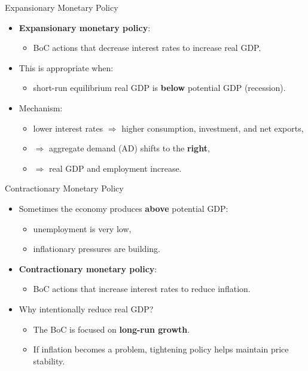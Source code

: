 \documentclass[aspectratio=169]{beamer}
\begin{document}
\begin{frame}{Expansionary Monetary Policy}
\transfade
\begin{itemize}[<+->]
  \item \textbf{Expansionary monetary policy}:
  \begin{itemize}[<+->]
    \item BoC actions that \alert{decrease} interest rates to \alert{increase} real GDP.
  \end{itemize}
  \item This is appropriate when:
  \begin{itemize}[<+->]
    \item short-run equilibrium real GDP is \textbf{below} potential GDP (recession).
  \end{itemize}
  \item Mechanism:
  \begin{itemize}[<+->]
    \item lower interest rates \(\Rightarrow\) higher consumption, investment, and net exports,
    \item \(\Rightarrow\) aggregate demand (AD) shifts to the \textbf{right},
    \item \(\Rightarrow\) real GDP and employment increase.
  \end{itemize}
\end{itemize}
\end{frame}



\begin{frame}{Contractionary Monetary Policy}
\transfade
\begin{itemize}[<+->]
  \item Sometimes the economy produces \textbf{above} potential GDP:
  \begin{itemize}[<+->]
    \item unemployment is very low,
    \item inflationary pressures are building.
  \end{itemize}
  \item \textbf{Contractionary monetary policy}:
  \begin{itemize}[<+->]
    \item BoC actions that \alert{increase} interest rates to \alert{reduce} inflation.
  \end{itemize}
  \item Why intentionally reduce real GDP?
  \begin{itemize}[<+->]
    \item The BoC is focused on \textbf{long-run growth}.
    \item If inflation becomes a problem, tightening policy helps maintain \alert{price stability}.
  \end{itemize}
\end{itemize}
\end{frame}
\end{document}
